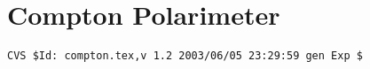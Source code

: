 \newpage
\section{Compton Polarimeter}

%
%
{\small
\begin{verbatim}CVS $Id: compton.tex,v 1.2 2003/06/05 23:29:59 gen Exp $\end{verbatim}
}
